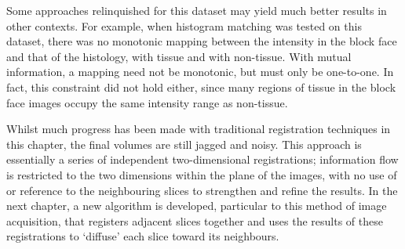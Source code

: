   Some approaches relinquished for this dataset may yield much better results in other contexts. For example, when histogram matching was tested on this dataset, there was no monotonic mapping between the intensity in the block face and that of the histology, with tissue and with non-tissue. With mutual information, a mapping need not be monotonic, but must only be one-to-one. In fact, this constraint did not hold either, since many regions of tissue in the block face images occupy the same intensity range as non-tissue.
	
	Whilst much progress has been made with traditional registration techniques in this chapter, the final volumes are still jagged and noisy. This approach is essentially a series of independent two-dimensional registrations; information flow is restricted to the two dimensions within the plane of the images, with no use of or reference to the neighbouring slices to strengthen and refine the results. In the next chapter, a new algorithm is developed, particular to this method of image acquisition, that registers adjacent slices together and uses the results of these registrations to `diffuse' each slice toward its neighbours.



